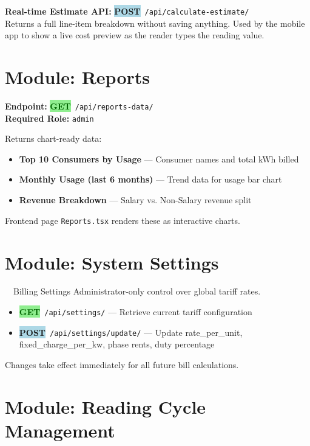 \documentclass[12pt, a4paper]{report}
\newcommand{\httpget}{\colorbox{lightGreen}{\textcolor{darkGreen}{\textbf{\small GET}}}}
\newcommand{\httppost}{\colorbox{lightBlue}{\textcolor{deepBlue}{\textbf{\small POST}}}}
\newenvironment{featurelist}{%
    \begin{itemize}[leftmargin=1.5em, itemsep=2pt, parsep=0pt]
}{%
    \end{itemize}
}
\begin{document}
\textbf{Real-time Estimate API:} \httppost\ \texttt{/api/calculate-estimate/}\\
Returns a full line-item breakdown without saving anything. Used by the mobile app to show a live cost preview as the reader types the reading value.

\section{Module: Reports}

\textbf{Endpoint:} \httpget\ \texttt{/api/reports-data/}\\
\textbf{Required Role:} \texttt{admin}

Returns chart-ready data:
\begin{featurelist}
    \item \textbf{Top 10 Consumers by Usage} — Consumer names and total kWh billed
    \item \textbf{Monthly Usage (last 6 months)} — Trend data for usage bar chart
    \item \textbf{Revenue Breakdown} — Salary vs. Non-Salary revenue split
\end{featurelist}

Frontend page \texttt{Reports.tsx} renders these as interactive charts.

\section{Module: System Settings}

\begin{modulebox}{\faCog\ \ Billing Settings}
Administrator-only control over global tariff rates.
\end{modulebox}

\begin{featurelist}
    \item \httpget\ \texttt{/api/settings/} — Retrieve current tariff configuration
    \item \httppost\ \texttt{/api/settings/update/} — Update rate\_per\_unit, fixed\_charge\_per\_kw, phase rents, duty percentage
\end{featurelist}

Changes take effect immediately for all future bill calculations.

\section{Module: Reading Cycle Management}
\end{document}
